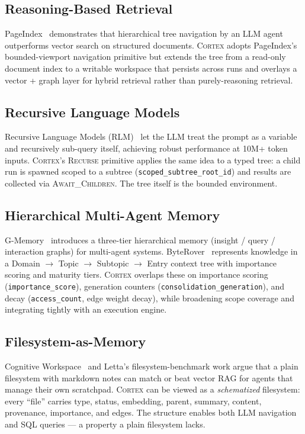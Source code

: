 \documentclass[11pt,a4paper]{article}
\theoremstyle{cortexprop}
\newcommand{\op}[1]{\textsc{#1}}
\newcommand{\code}[1]{\texttt{#1}}
\begin{document}
\subsection{Reasoning-Based Retrieval}
PageIndex~\cite{vectifyai2025pageindex} demonstrates that hierarchical tree
navigation by an LLM agent outperforms vector search on structured
documents. \textsc{Cortex} adopts PageIndex's bounded-viewport navigation
primitive but extends the tree from a read-only document index to a
writable workspace that persists across runs and overlays a vector + graph
layer for hybrid retrieval rather than purely-reasoning retrieval.

\subsection{Recursive Language Models}
Recursive Language Models (RLM)~\cite{zhang2025rlm} let the LLM treat the
prompt as a variable and recursively sub-query itself, achieving robust
performance at 10M+ token inputs. \textsc{Cortex}'s \op{Recurse} primitive
applies the same idea to a typed tree: a child run is spawned scoped to a
subtree (\code{scoped\_subtree\_root\_id}) and results are collected via
\op{Await\_Children}. The tree itself is the bounded environment.

\subsection{Hierarchical Multi-Agent Memory}
G-Memory~\cite{wang2025gmemory} introduces a three-tier hierarchical memory
(insight / query / interaction graphs) for multi-agent systems.
ByteRover~\cite{byterover2026} represents knowledge in a Domain $\to$ Topic
$\to$ Subtopic $\to$ Entry context tree with importance scoring and maturity
tiers. \textsc{Cortex} overlaps these on importance scoring
(\code{importance\_score}), generation counters
(\code{consolidation\_generation}), and decay (\code{access\_count}, edge
weight decay), while broadening scope coverage and integrating tightly with
an execution engine.

\subsection{Filesystem-as-Memory}
Cognitive Workspace~\cite{liu2025cogworkspace} and Letta's
filesystem-benchmark work argue that a plain filesystem with markdown notes
can match or beat vector RAG for agents that manage their own scratchpad.
\textsc{Cortex} can be viewed as a \textit{schematized} filesystem: every
``file'' carries type, status, embedding, parent, summary, content,
provenance, importance, and edges. The structure enables both LLM
navigation and SQL queries --- a property a plain filesystem lacks.
\end{document}
